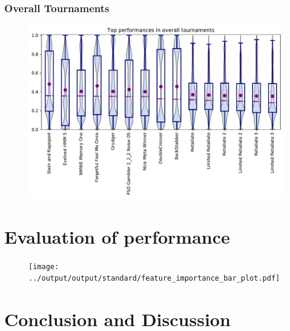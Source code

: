\documentclass{article}
\begin{document}
\subsubsection{Overall Tournaments}

\begin{table}
    \begin{center}
    
    \end{center}
\end{table}


\begin{figure}
    \centering
    \includegraphics[width=.9\textwidth]{../images/performance_merged.pdf}
\end{figure}


\section{Evaluation of performance}\label{section:evaluation_of_performance}

\begin{figure}
    \centering
    \texttt{[image: ../output/output/standard/feature\_importance\_bar\_plot.pdf]}
\end{figure}

\section{Conclusion and Discussion}\label{section:conclusion}



\end{document}
